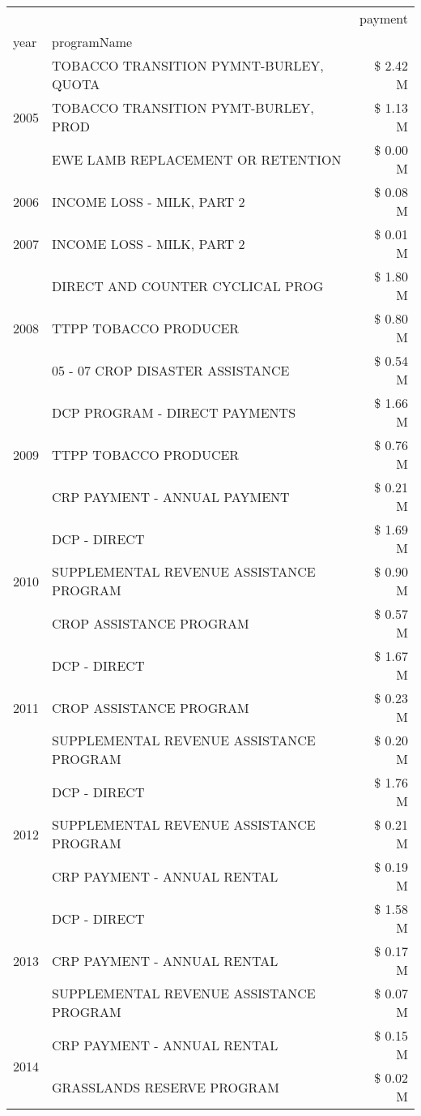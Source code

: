 \begin{tabular}{llr}
\toprule
 &  & payment \\
year & programName &  \\
\midrule
\multirow[t]{3}{*}{2005} & TOBACCO TRANSITION PYMNT-BURLEY, QUOTA & \$ 2.42 M \\
 & TOBACCO TRANSITION PYMT-BURLEY, PROD & \$ 1.13 M \\
 & EWE LAMB REPLACEMENT OR RETENTION & \$ 0.00 M \\
\cline{1-3}
2006 & INCOME LOSS - MILK, PART 2 & \$ 0.08 M \\
\cline{1-3}
2007 & INCOME LOSS - MILK, PART 2 & \$ 0.01 M \\
\cline{1-3}
\multirow[t]{3}{*}{2008} & DIRECT AND COUNTER CYCLICAL PROG & \$ 1.80 M \\
 & TTPP TOBACCO PRODUCER & \$ 0.80 M \\
 & 05 - 07 CROP DISASTER ASSISTANCE & \$ 0.54 M \\
\cline{1-3}
\multirow[t]{3}{*}{2009} & DCP PROGRAM - DIRECT PAYMENTS & \$ 1.66 M \\
 & TTPP TOBACCO PRODUCER & \$ 0.76 M \\
 & CRP PAYMENT - ANNUAL PAYMENT & \$ 0.21 M \\
\cline{1-3}
\multirow[t]{3}{*}{2010} & DCP - DIRECT & \$ 1.69 M \\
 & SUPPLEMENTAL REVENUE ASSISTANCE PROGRAM & \$ 0.90 M \\
 & CROP ASSISTANCE PROGRAM & \$ 0.57 M \\
\cline{1-3}
\multirow[t]{3}{*}{2011} & DCP - DIRECT & \$ 1.67 M \\
 & CROP ASSISTANCE PROGRAM & \$ 0.23 M \\
 & SUPPLEMENTAL REVENUE ASSISTANCE PROGRAM & \$ 0.20 M \\
\cline{1-3}
\multirow[t]{3}{*}{2012} & DCP - DIRECT & \$ 1.76 M \\
 & SUPPLEMENTAL REVENUE ASSISTANCE PROGRAM & \$ 0.21 M \\
 & CRP PAYMENT - ANNUAL RENTAL & \$ 0.19 M \\
\cline{1-3}
\multirow[t]{3}{*}{2013} & DCP - DIRECT & \$ 1.58 M \\
 & CRP PAYMENT - ANNUAL RENTAL & \$ 0.17 M \\
 & SUPPLEMENTAL REVENUE ASSISTANCE PROGRAM & \$ 0.07 M \\
\cline{1-3}
\multirow[t]{3}{*}{2014} & CRP PAYMENT - ANNUAL RENTAL & \$ 0.15 M \\
 & GRASSLANDS RESERVE PROGRAM & \$ 0.02 M \\

\end{tabular}
